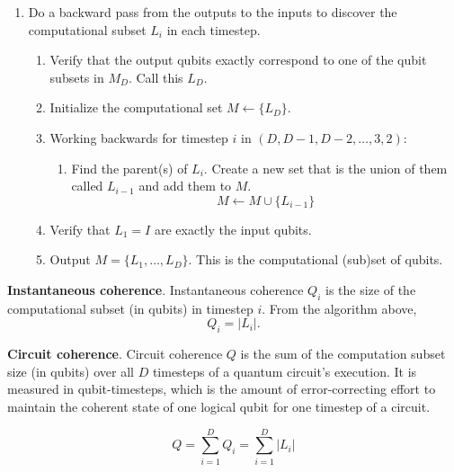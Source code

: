 \begin{enumerate}
\begin{enumerate}
\end{enumerate}

\item
Do a backward pass from the outputs to the inputs to discover the computational subset $L_i$ in each timestep.

\begin{enumerate}
\item
Verify that the output qubits exactly correspond to one of the qubit subsets
in $M_D$. Call this $L_D$.
\item
Initialize the computational set $M \leftarrow \{ L_D \}$.
\item
Working backwards for timestep $i$ in $(D, D-1, D-2, \ldots, 3, 2)$:
\begin{enumerate}
\item
Find the parent(s) of $L_i$. Create a new set that is the union of them called $L_{i-1}$
and add them to $M$.
\begin{equation}
M \leftarrow M \cup \{L_{i-1}\}
\end{equation}
\end{enumerate}

\item Verify that $L_1 = I$ are exactly the input qubits.

\item Output $M = \{L_1, \ldots, L_D\}$. This is the computational (sub)set of qubits.
\end{enumerate}

\end{enumerate}

\begin{definition}{\textbf{Instantaneous coherence}.}
Instantaneous coherence $Q_i$ is the size of the computational subset
(in qubits) in timestep $i$. From the algorithm above,
\begin{equation}
Q_i = |L_i|\text{.}
\end{equation}
\end{definition}

\begin{definition}{\textbf{Circuit coherence}.}
Circuit coherence $Q$ is the sum of the computation subset size (in qubits)
over all $D$ timesteps of a quantum circuit's execution. It is measured
in qubit-timesteps, which is the amount of error-correcting effort to
maintain the coherent state of one logical qubit for one timestep of a circuit.

\begin{equation}
Q = \sum_{i=1}^D Q_i = \sum_{i=1}^D |L_i|
\end{equation}
\end{definition}


